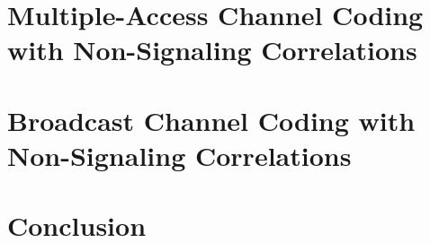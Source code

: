 \documentclass[a4paper, 11pt]{memoir}
\theoremstyle{remark}
\begin{document}


\cleardoublepage
{\let\newpage\relax
\chapter{Multiple-Access Channel Coding with Non-Signaling Correlations}
\label{chap:MAC}
}



\cleardoublepage
{\let\newpage\relax
  \chapter{Broadcast Channel Coding with Non-Signaling Correlations}
\label{chap:Broadcast}
}




\chapter*{Conclusion}





\backmatter
\listoffigures
{}
\clearpage
\listoftables
{}
\end{document}
